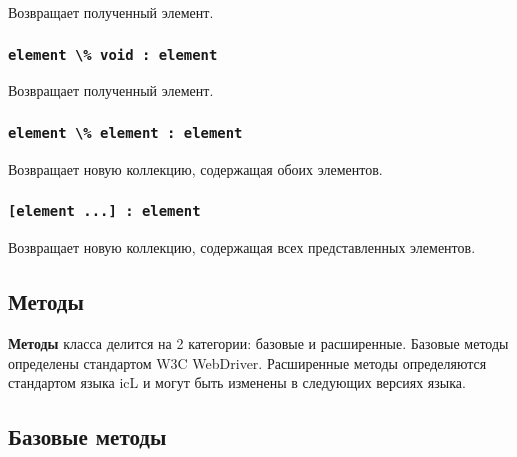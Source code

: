 \documentclass[a4paper, 14pt]{extarticle}
\begin{document}
Возвращает полученный элемент.

\subsubsection{\lstinline|element \% void : element|}

Возвращает полученный элемент.

\subsubsection{\lstinline|element \% element : element|}

Возвращает новую коллекцию, содержащая обоих элементов.

\subsubsection{\lstinline|[element ...] : element|}

Возвращает новую коллекцию, содержащая всех представленных элементов.

\subsection{Методы}

{\bf Методы} класса  делится на 2 категории: базовые и расширенные. Базовые методы определены стандартом W3C WebDriver. Расширенные методы определяются стандартом языка icL и могут быть изменены в следующих версиях языка.

\subsection{Базовые методы}
\end{document}
